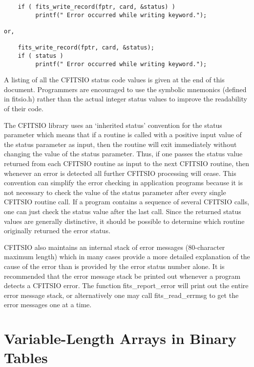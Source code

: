 \documentclass[11pt]{book}
\begin{document}
\begin{verbatim}
    if ( fits_write_record(fptr, card, &status) )
         printf(" Error occurred while writing keyword.");

or,

    fits_write_record(fptr, card, &status);
    if ( status )
         printf(" Error occurred while writing keyword.");
\end{verbatim}
A listing of all the CFITSIO status code values is given at the end of
this document.  Programmers are encouraged to use the symbolic
mnemonics (defined in fitsio.h) rather than the actual integer status
values to improve the readability of their code.

The CFITSIO library uses an `inherited status' convention for the
status parameter which means that if a routine is called with a
positive input value of the status parameter as input, then the routine
will exit immediately without changing the value of the status
parameter.  Thus, if one passes the status value returned from each
CFITSIO routine as input to the next CFITSIO routine, then whenever an
error is detected all further CFITSIO processing will cease.  This
convention can simplify the error checking in application programs
because it is not necessary to check the value of the status parameter
after every single CFITSIO routine call.  If a program contains a
sequence of several CFITSIO calls, one can just check the status value
after the last call.  Since the returned status values are generally
distinctive, it should be possible to determine which routine
originally returned the error status.

CFITSIO also maintains an internal stack of error messages
(80-character maximum length)  which in many cases provide a more
detailed explanation of the cause of the error than is provided by the
error status number alone.  It is recommended that the error message
stack be printed out whenever a program detects a CFITSIO error.  The
function fits\_report\_error will print out the entire error message
stack, or alternatively one may call fits\_read\_errmsg to get the
error messages one at a time.


\section{Variable-Length Arrays in Binary Tables}
\end{document}
